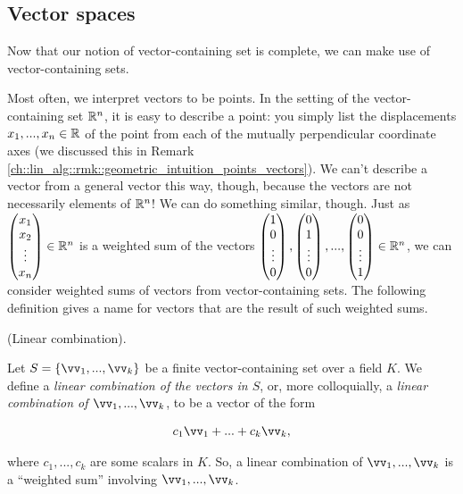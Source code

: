 \subsection*{Vector spaces}

Now that our notion of vector-containing set is complete, we can make use of vector-containing sets. 

Most often, we interpret vectors to be points. In the setting of the vector-containing set $\mathbb{R}^n$, it is easy to describe a point: you simply list the displacements $x_1, ..., x_n \in \mathbb{R}$ of the point from each of the mutually perpendicular coordinate axes (we discussed this in Remark \ref{ch::lin_alg::rmk::geometric_intuition_points_vectors}). We can't describe a vector from a general vector this way, though, because the vectors are not necessarily elements of $\mathbb{R}^n$! We can do something similar, though. Just as $\begin{pmatrix} x_1 \\ x_2 \\ \vdots \\ x_n \end{pmatrix} \in \mathbb{R}^n$ is a weighted sum of the vectors $\begin{pmatrix} 1 \\ 0 \\ \vdots \\ 0 \end{pmatrix}, \begin{pmatrix} 0 \\ 1 \\ \vdots \\ 0 \end{pmatrix}, ..., \begin{pmatrix} 0 \\ 0 \\ \vdots \\ 1 \end{pmatrix} \in \mathbb{R}^n$, we can consider weighted sums of vectors from vector-containing sets. The following definition gives a name for vectors that are the result of such weighted sums.

\begin{defn}
    (Linear combination).
    
    Let $S = \{\vv_1, ..., \vv_k\}$ be a finite vector-containing set over a field $K$. We define a \textit{linear combination of the vectors in $S$}, or, more colloquially, a \textit{linear combination of $\vv_1, ..., \vv_k$}, to be a vector of the form
    
    \begin{align*}
        c_1 \vv_1 + ... + c_k \vv_k,
    \end{align*}
    
    where $c_1, ..., c_k$ are some scalars in $K$. So, a linear combination of $\vv_1, ..., \vv_k$ is a ``weighted sum'' involving $\vv_1, ..., \vv_k$.
\end{defn}

